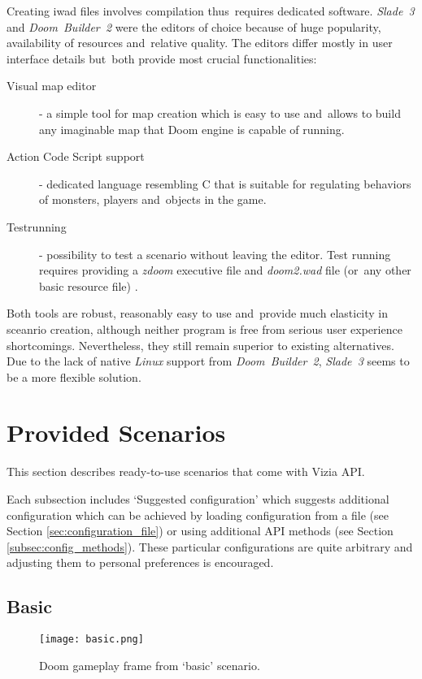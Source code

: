 	Creating iwad files involves compilation thus~requires dedicated software. \emph{Slade~3} and \emph{Doom~Builder~2} were the editors of choice because of huge popularity, availability of resources and~relative quality. The editors differ mostly in user interface details but~both provide most crucial functionalities:

	\begin{description}
		\item [Visual map editor] - a simple tool for map creation which is easy to use and~allows to build any imaginable map that Doom engine is capable of running.
		\item [Action Code Script support] - dedicated language resembling C that is suitable for regulating behaviors of monsters, players and~objects in the game.
		\item [Testrunning] - possibility to test a scenario without leaving the editor. Test running requires providing a \emph{zdoom} executive file and \emph{doom2.wad} file (or~any other basic resource file) . 
	\end{description}

	Both tools are robust, reasonably easy to use and~provide much elasticity in sceanrio creation, although neither program is free from serious user experience shortcomings. Nevertheless, they still remain superior to existing alternatives. Due to the lack of native \emph{Linux} support from \emph{Doom~Builder~2}, \emph{Slade~3} seems to be a more flexible solution. 

	\newpage
\section{Provided Scenarios}\label{sec:scenarios}
	This section describes ready-to-use scenarios that come with Vizia API.

	Each subsection includes `Suggested configuration' which suggests additional configuration which can be achieved by loading	configuration from a file (see Section \ref{sec:configuration_file}) or using additional API methods (see Section \ref{subsec:config_methods}). These particular configurations are quite arbitrary and adjusting them to personal preferences is encouraged.

	\subsection{Basic}\label{subsec:basic}
		
		\begin{figure}
			\centering
			\texttt{[image: basic.png]}
			\caption{Doom gameplay frame from `basic' scenario.}\label{fig:basic}
		\end{figure}

